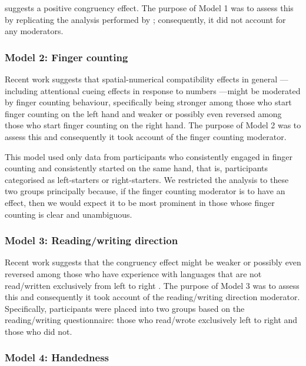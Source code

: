 \documentclass[A4paper,man,floatsintext]{apa6}
\theoremstyle{definition}
\theoremstyle{definition}
\theoremstyle{definition}
\theoremstyle{remark}
\begin{document}
\textcite{Fischer:2003ju} suggests a positive congruency effect. The
purpose of Model 1 was to assess this by replicating the analysis
performed by \textcite{Fischer:2003ju}; consequently, it did not account
for any moderators.

\subsubsection{Model 2: Finger counting}\label{model-2-finger-counting}

Recent work suggests that spatial-numerical compatibility effects in
general \autocite{Fischer:2008bv}---including attentional cueing effects
in response to numbers \autocite{Fischer:2014kz}---might be moderated by
finger counting behaviour, specifically being stronger among those who
start finger counting on the left hand and weaker or possibly even
reversed among those who start finger counting on the right hand. The
purpose of Model 2 was to assess this and consequently it took account
of the finger counting moderator.

This model used only data from participants who consistently engaged in
finger counting and consistently started on the same hand, that is,
participants categorised as left-starters or right-starters. We
restricted the analysis to these two groups principally because, if the
finger counting moderator is to have an effect, then we would expect it
to be most prominent in those whose finger counting is clear and
unambiguous.

\subsubsection{Model 3: Reading/writing
direction}\label{model-3-readingwriting-direction}

Recent work suggests that the congruency effect might be weaker or
possibly even reversed among those who have experience with languages
that are not read/written exclusively from left to right
\autocites{Fischer:2008bv}{Shaki:2009ch}. The purpose of Model 3 was to
assess this and consequently it took account of the reading/writing
direction moderator. Specifically, participants were placed into two
groups based on the reading/writing questionnaire: those who read/wrote
exclusively left to right and those who did not.

\subsubsection{Model 4: Handedness}\label{model-4-handedness}
\end{document}
